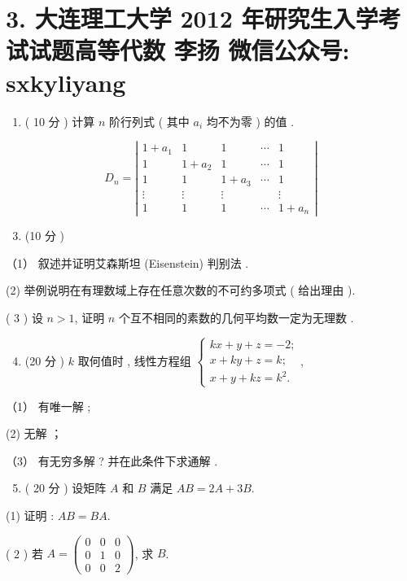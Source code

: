 \documentclass[10pt]{article}
\begin{document}
{\section{3. 大连理工大学 2012 年研究生入学考试试题高等代数 
 李扬 
 微信公众号: sxkyliyang}
\begin{enumerate}
  \item ( 10  分 )  计算  $n$  阶行列式  ( 其中  $a_{i}$  均不为零 )  的值 .
\end{enumerate}
$$
D_{n}=\left|\begin{array}{ccccc}
1+a_{1} & 1 & 1 & \cdots & 1 \\
1 & 1+a_{2} & 1 & \cdots & 1 \\
1 & 1 & 1+a_{3} & \cdots & 1 \\
\vdots & \vdots & \vdots & & \vdots \\
1 & 1 & 1 & \cdots & 1+a_{n}
\end{array}\right|
$$

\begin{enumerate}
  \setcounter{enumi}{2}
  \item (10  分 )
\end{enumerate}
（1） 叙述并证明艾森斯坦  (Eisenstein)  判别法 .

(2)  举例说明在有理数域上存在任意次数的不可约多项式  ( 给出理由 ).

( 3 )  设  $n>1$,  证明  $n$  个互不相同的素数的几何平均数一定为无理数 .

\begin{enumerate}
  \setcounter{enumi}{3}
  \item (20  分 ) $k$  取何值时 ,  线性方程组  $\left\{\begin{array}{l}k x+y+z=-2 ; \\ x+k y+z=k ; \\ x+y+k z=k^{2} .\end{array}\right.$,
\end{enumerate}
（1） 有唯一解 ;

(2)  无解 ；

（3） 有无穷多解 ?  并在此条件下求通解 .

\begin{enumerate}
  \setcounter{enumi}{4}
  \item ( 20  分 )  设矩阵  $A$  和  $B$  满足  $A B=2 A+3 B$.
\end{enumerate}
(1)  证明 : $A B=B A$.

( 2 )  若  $A=\left(\begin{array}{lll}0 & 0 & 0 \\ 0 & 1 & 0 \\ 0 & 0 & 2\end{array}\right)$,  求  $B$.

}
\end{document}
